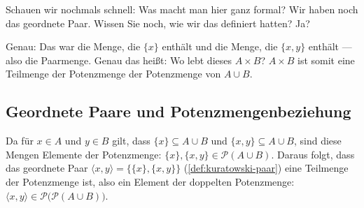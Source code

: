 \begin{spoken-clean}[continued]
Schauen wir nochmals schnell: Was macht man hier ganz formal? Wir haben noch das geordnete Paar. Wissen Sie noch, wie wir das definiert hatten? Ja?

Genau: Das war die Menge, die $\{x\}$ enthält und die Menge, die $\{x, y\}$ enthält --- also die Paarmenge. Genau das heißt: Wo lebt dieses $A \times B$? $A \times B$ ist somit eine Teilmenge der Potenzmenge der Potenzmenge von $A \cup B$.
\end{spoken-clean}

\subsection{Geordnete Paare und Potenzmengenbeziehung}
\begin{math-stroke}

\begin{explanation-of-steps}
Da für $x \in A$ und $y \in B$ gilt, dass $\{x\} \subseteq A \cup B$ und $\{x, y\} \subseteq A \cup B$, sind diese Mengen Elemente der Potenzmenge: $\{x\}, \{x, y\} \in \mathcal{P}(A \cup B)$. 
Daraus folgt, dass das geordnete Paar $\langle x, y \rangle = \{\{x\}, \{x, y\}\}$ (\cref{def:kuratowski-paar}) eine Teilmenge der Potenzmenge ist, also ein Element der doppelten Potenzmenge: $\langle x, y \rangle \in \mathcal{P}\bigl(\mathcal{P}(A \cup B)\bigr)$.
\end{explanation-of-steps}
\end{math-stroke}

